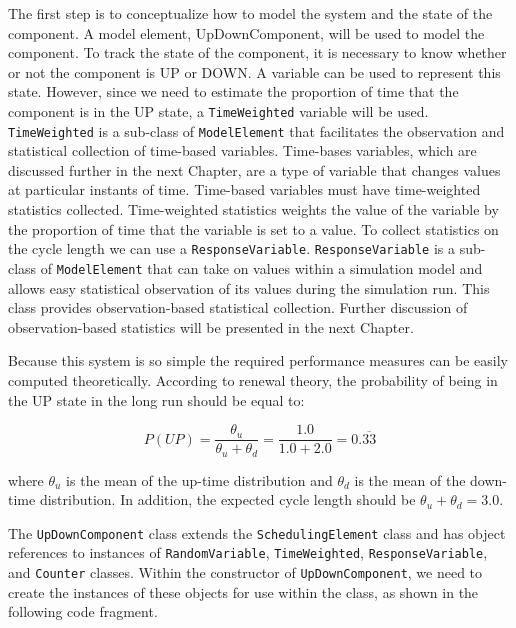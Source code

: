 \documentclass[
]{book}
\theoremstyle{definition}
\theoremstyle{definition}
\theoremstyle{definition}
\theoremstyle{definition}
\theoremstyle{remark}
\begin{document}
The first step is to conceptualize how to model the system and the state
of the component. A model element, UpDownComponent, will be used to
model the component. To track the state of the component, it is
necessary to know whether or not the component is UP or DOWN. A variable
can be used to represent this state. However, since we need to estimate
the proportion of time that the component is in the UP state, a
\texttt{TimeWeighted} variable will be used. \texttt{TimeWeighted} is a sub-class of
\texttt{ModelElement} that facilitates the observation and statistical collection
of time-based variables. Time-bases variables, which are discussed
further in the next Chapter, are a type of variable that changes values
at particular instants of time. Time-based variables must have
time-weighted statistics collected. Time-weighted statistics weights the
value of the variable by the proportion of time that the variable is set
to a value. To collect statistics on the cycle length we can use a
\texttt{ResponseVariable}. \texttt{ResponseVariable} is a sub-class of \texttt{ModelElement} that
can take on values within a simulation model and allows easy statistical
observation of its values during the simulation run. This class provides
observation-based statistical collection. Further discussion of
observation-based statistics will be presented in the next Chapter.

Because this system is so simple the required performance measures can
be easily computed theoretically. According to renewal theory, the
probability of being in the UP state in the long run should be equal to:

\[P(UP) = \frac{\theta_{u}}{\theta_{u}+\theta_{d}} = \frac{1.0}{1.0+2.0}=0.\overline{33}\]

where \(\theta_{u}\) is the mean of the up-time distribution and
\(\theta_{d}\) is the mean of the down-time distribution. In addition, the
expected cycle length should be \(\theta_{u}+\theta_{d} = 3.0\).

The \texttt{UpDownComponent} class extends the \texttt{SchedulingElement} class and has
object references to instances of \texttt{RandomVariable}, \texttt{TimeWeighted},
\texttt{ResponseVariable}, and \texttt{Counter} classes. Within the constructor of
\texttt{UpDownComponent}, we need to create the instances of these objects for
use within the class, as shown in the following code fragment.
\end{document}
